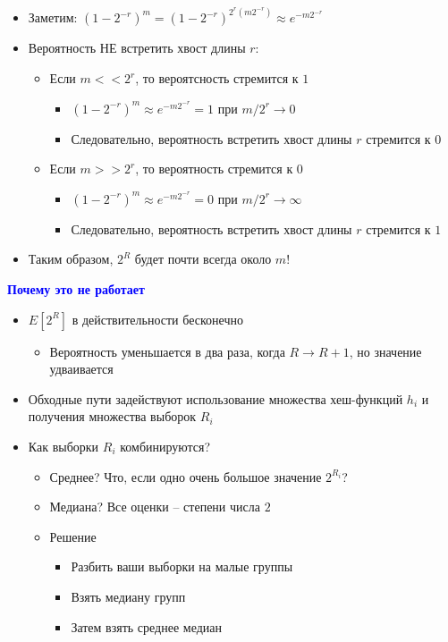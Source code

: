\documentclass[landscape]{slides}
\begin{document}
\begin{normalsize}
\begin{slide}
\begin{itemize}
\item Заметим: $(1-2^{-r})^m = (1-2^{-r})^{2^r(m2^{-r})}\approx e^{-m2^{-r}}$
\item Вероятность НЕ встретить хвост длины $r$:
  \begin{itemize}
  \item Если $m<<2^r$, то вероятсность стремится к $1$
    \begin{itemize}
    \item $(1-2^{-r})^m\approx e^{-m2^{-r}} = 1$ при $m/2^r\to 0$
    \item Следовательно, вероятность встретить хвост длины $r$ стремится к $0$
    \end{itemize}
  \item Если $m>>2^r$, то вероятность стремится к $0$
    \begin{itemize}
    \item $(1-2^{-r})^m \approx e^{-m2^{-r}}=0$ при $m/2^r\to\infty$
    \item Следовательно, вероятность встретить хвост длины $r$ стремится к $1$
    \end{itemize}
  \end{itemize}
\item Таким образом, $2^R$ будет почти всегда около $m$!
\end{itemize}
\end{slide}


\begin{slide}
\textbf{\textcolor{blue}{Почему это не работает}}

\begin{itemize}
\item $E[2^R]$ в действительности бесконечно
  \begin{itemize}
  \item Вероятность уменьшается в два раза, когда $R\to R+1$, но значение удваивается
  \end{itemize}
\item Обходные пути задействуют использование множества хеш-функций $h_i$ и получения множества выборок $R_i$
\item Как выборки $R_i$ комбинируются?
  \begin{itemize}
  \item Среднее? Что, если одно очень большое значение $2^{R_i}$?
  \item Медиана? Все оценки -- степени числа $2$
  \item Решение
    \begin{itemize} 
    \item Разбить ваши выборки на малые группы
    \item Взять медиану групп
    \item Затем взять среднее медиан
    \end{itemize}
  \end{itemize}
\end{itemize}
\end{slide}




\end{normalsize}
\end{document}
